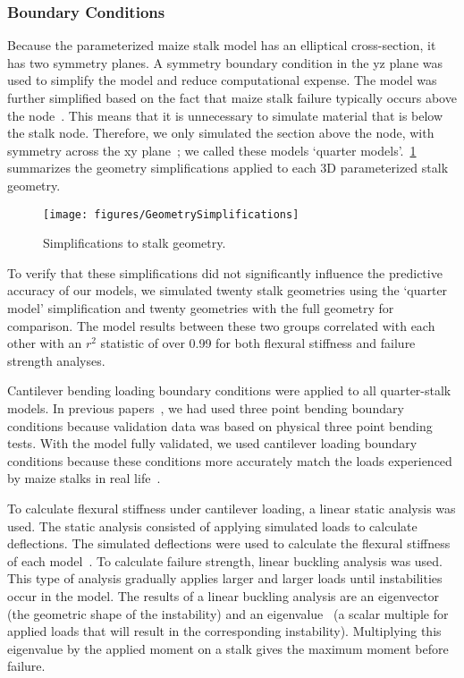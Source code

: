 \subsubsection{Boundary Conditions}
\label{sssec:ch4_boundary_conditions}
Because the parameterized maize stalk model has an elliptical cross-section, it has two symmetry planes. A symmetry boundary condition in the yz plane was used to simplify the model and reduce computational expense. The model was further simplified based on the fact that maize stalk failure typically occurs above the node~. This means that it is unnecessary to simulate material that is below the stalk node. Therefore, we only simulated the section above the node, with symmetry across the xy plane~; we called these models ‘quarter models’.~\cref{fig:GeometrySimplifications_ch4} summarizes the geometry simplifications applied to each 3D parameterized stalk geometry.

\begin{figure}[htbp]
	\centering
	\texttt{[image: figures/GeometrySimplifications]}
	\caption[Simplifications to stalk geometry.]{Simplifications to stalk geometry.}
	\label{fig:GeometrySimplifications_ch4}
\end{figure}

To verify that these simplifications did not significantly influence the predictive accuracy of our models, we simulated twenty stalk geometries using the ‘quarter model’ simplification and twenty geometries with the full geometry for comparison. The model results between these two groups correlated with each other with an ${r^{2}}$ statistic of over 0.99 for both flexural stiffness and failure strength analyses.

Cantilever bending loading boundary conditions were applied to all quarter-stalk models. In previous papers~, we had used three point bending boundary conditions because validation data was based on physical three point bending tests. With the model fully validated, we used cantilever loading boundary conditions because these conditions more accurately match the loads experienced by maize stalks in real life~.

To calculate flexural stiffness under cantilever loading, a linear static analysis was used. The static analysis consisted of applying simulated loads to calculate deflections. The simulated deflections were used to calculate the flexural stiffness of each model~. To calculate failure strength, linear buckling analysis was used. This type of analysis gradually applies larger and larger loads until instabilities occur in the model. The results of a linear buckling analysis are an eigenvector (the geometric shape of the instability) and an eigenvalue~ (a scalar multiple for applied loads that will result in the corresponding instability). Multiplying this eigenvalue by the applied moment on a stalk gives the maximum moment before failure. 

